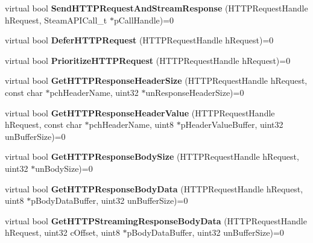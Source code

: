 \begin{DoxyCompactItemize}
\item 
\mbox{\label{class_i_steam_h_t_t_p_aaa3eb206430633b3cb2fdd1f628e7e70}} 
virtual bool {\bfseries Send\+H\+T\+T\+P\+Request\+And\+Stream\+Response} (H\+T\+T\+P\+Request\+Handle h\+Request, Steam\+A\+P\+I\+Call\+\_\+t $\ast$p\+Call\+Handle)=0
\item 
\mbox{\label{class_i_steam_h_t_t_p_ae4d3d00074fc519f3b7ed31614777c22}} 
virtual bool {\bfseries Defer\+H\+T\+T\+P\+Request} (H\+T\+T\+P\+Request\+Handle h\+Request)=0
\item 
\mbox{\label{class_i_steam_h_t_t_p_ae869069d52aca4f2a40878c8782f2dfd}} 
virtual bool {\bfseries Prioritize\+H\+T\+T\+P\+Request} (H\+T\+T\+P\+Request\+Handle h\+Request)=0
\item 
\mbox{\label{class_i_steam_h_t_t_p_a1c91c0a67456fef68226b8798f5402c0}} 
virtual bool {\bfseries Get\+H\+T\+T\+P\+Response\+Header\+Size} (H\+T\+T\+P\+Request\+Handle h\+Request, const char $\ast$pch\+Header\+Name, uint32 $\ast$un\+Response\+Header\+Size)=0
\item 
\mbox{\label{class_i_steam_h_t_t_p_a29c5454400b9633a7b16f4179abf87fc}} 
virtual bool {\bfseries Get\+H\+T\+T\+P\+Response\+Header\+Value} (H\+T\+T\+P\+Request\+Handle h\+Request, const char $\ast$pch\+Header\+Name, uint8 $\ast$p\+Header\+Value\+Buffer, uint32 un\+Buffer\+Size)=0
\item 
\mbox{\label{class_i_steam_h_t_t_p_a13e89869bd45e164c0616ddee917473b}} 
virtual bool {\bfseries Get\+H\+T\+T\+P\+Response\+Body\+Size} (H\+T\+T\+P\+Request\+Handle h\+Request, uint32 $\ast$un\+Body\+Size)=0
\item 
\mbox{\label{class_i_steam_h_t_t_p_acb601e559fac3c1551fc3e1f7c0faf4c}} 
virtual bool {\bfseries Get\+H\+T\+T\+P\+Response\+Body\+Data} (H\+T\+T\+P\+Request\+Handle h\+Request, uint8 $\ast$p\+Body\+Data\+Buffer, uint32 un\+Buffer\+Size)=0
\item 
\mbox{\label{class_i_steam_h_t_t_p_a01a26e6004a82dc44b606f7f09d9bbb5}} 
virtual bool {\bfseries Get\+H\+T\+T\+P\+Streaming\+Response\+Body\+Data} (H\+T\+T\+P\+Request\+Handle h\+Request, uint32 c\+Offset, uint8 $\ast$p\+Body\+Data\+Buffer, uint32 un\+Buffer\+Size)=0

\end{DoxyCompactItemize}
